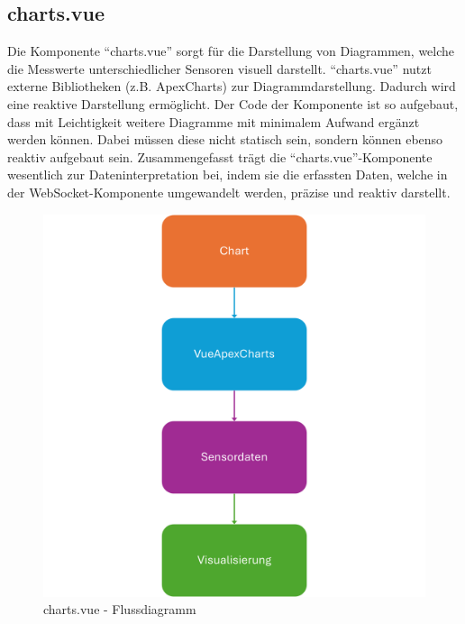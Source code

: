 \subsection{charts.vue}
\label{subsec:frontend_charts.vue}
Die Komponente ``charts.vue'' sorgt für die Darstellung von Diagrammen,
welche die Messwerte unterschiedlicher Sensoren visuell darstellt.
%
``charts.vue'' nutzt externe Bibliotheken (z.B. ApexCharts) zur Diagrammdarstellung.
Dadurch wird eine reaktive Darstellung ermöglicht.
%
Der Code der Komponente ist so aufgebaut, dass mit Leichtigkeit weitere Diagramme
mit minimalem Aufwand ergänzt werden können. 
Dabei müssen diese nicht statisch sein, 
sondern können ebenso reaktiv aufgebaut sein.
%
Zusammengefasst trägt die ``charts.vue''-Komponente wesentlich zur 
Dateninterpretation bei, indem sie die erfassten Daten,
welche in der WebSocket-Komponente umgewandelt werden, präzise und reaktiv darstellt.

\begin{figure}[H]
  \includegraphics[width=\textwidth, center]{img/Charts_FD.png}
  \caption{charts.vue - Flussdiagramm}
  \label{fig:charts_Flowchart}
\end{figure}


